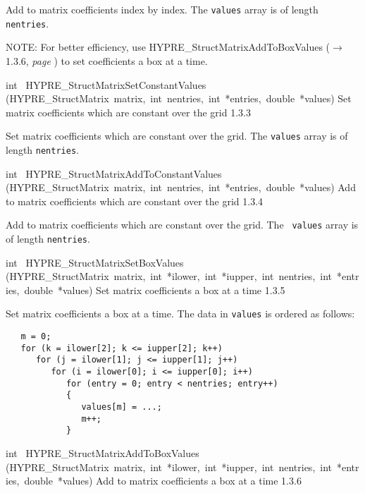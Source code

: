\documentclass{article}
\begin{document}
\begin{cxxentry}
\begin{cxxentry}
\begin{cxxfunction}
\begin{cxxdoc}
Add to matrix coefficients index by index.  The {\tt values} array is of
length {\tt nentries}.

NOTE: For better efficiency, use HYPRE\_StructMatrixAddToBoxValues ($\rightarrow$1.3.6, {\em page \pageref{cxx.1.3.6}}) to
set coefficients a box at a time.
\end{cxxdoc}
\end{cxxfunction}
\begin{cxxfunction}
{int\ }
        {HYPRE\_StructMatrixSetConstantValues}
        {(HYPRE\_StructMatrix\ matrix,\ int\ nentries,\ int\ *entries,\ double\ *values)}
        {
Set matrix coefficients which are constant over the grid}
        {1.3.3}
\begin{cxxdoc}

Set matrix coefficients which are constant over the grid.  The {\tt values}
array is of length {\tt nentries}.
\end{cxxdoc}
\end{cxxfunction}
\begin{cxxfunction}
{int\ }
        {HYPRE\_StructMatrixAddToConstantValues}
        {(HYPRE\_StructMatrix\ matrix,\ int\ nentries,\ int\ *entries,\ double\ *values)}
        {
Add to matrix coefficients which are constant over the grid}
        {1.3.4}
\begin{cxxdoc}

Add to matrix coefficients which are constant over the grid.  The {\tt
values} array is of length {\tt nentries}.
\end{cxxdoc}
\end{cxxfunction}
\begin{cxxfunction}
{int\ }
        {HYPRE\_StructMatrixSetBoxValues}
        {(HYPRE\_StructMatrix\ matrix,\ int\ *ilower,\ int\ *iupper,\ int\ nentries,\ int\ *entries,\ double\ *values)}
        {
Set matrix coefficients a box at a time}
        {1.3.5}
\begin{cxxdoc}

Set matrix coefficients a box at a time.  The data in {\tt values} is ordered
as follows:

\begin{verbatim}
   m = 0;
   for (k = ilower[2]; k <= iupper[2]; k++)
      for (j = ilower[1]; j <= iupper[1]; j++)
         for (i = ilower[0]; i <= iupper[0]; i++)
            for (entry = 0; entry < nentries; entry++)
            {
               values[m] = ...;
               m++;
            }
   \end{verbatim}
\end{cxxdoc}
\end{cxxfunction}
\begin{cxxfunction}
{int\ }
        {HYPRE\_StructMatrixAddToBoxValues}
        {(HYPRE\_StructMatrix\ matrix,\ int\ *ilower,\ int\ *iupper,\ int\ nentries,\ int\ *entries,\ double\ *values)}
        {
Add to matrix coefficients a box at a time}
        {1.3.6}
\begin{cxxdoc}


\end{cxxdoc}
\end{cxxfunction}
\end{cxxentry}
\end{cxxentry}
\end{document}
